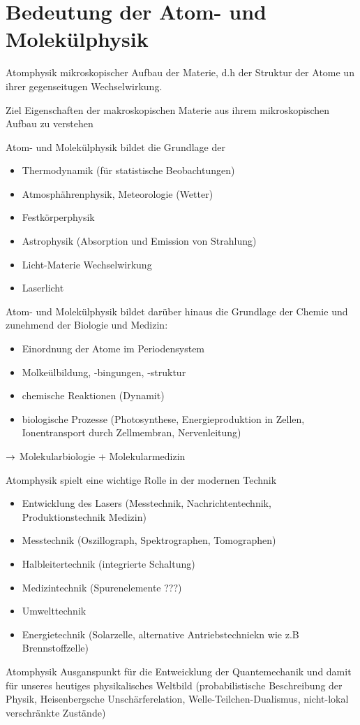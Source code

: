 \section{Bedeutung der Atom- und Molekülphysik} %
\label{sec:Bedeutung der Atom- und Molekülphysik}
\begin{erl}{Atomphysik}
    mikroskopischer Aufbau der Materie, d.h der Struktur der Atome un ihrer
    gegenseitugen Wechselwirkung. 
\end{erl}

\begin{erl}{Ziel}
    Eigenschaften der makroskopischen Materie aus ihrem mikroskopischen Aufbau
    zu verstehen
\end{erl}

Atom- und Molekülphysik bildet die Grundlage der
\begin{itemize}
    \item Thermodynamik (für statistische Beobachtungen)
    \item Atmosphährenphysik, Meteorologie (Wetter)
    \item Festkörperphysik
    \item Astrophysik (Absorption und Emission von Strahlung)
    \item Licht-Materie Wechselwirkung
    \item Laserlicht
\end{itemize}
Atom- und Molekülphysik bildet darüber hinaus die Grundlage der Chemie und
zunehmend der Biologie und Medizin:
\begin{itemize}
    \item Einordnung der Atome im Periodensystem
    \item Molkeülbildung, -bingungen, -struktur
    \item chemische Reaktionen (Dynamit)
    \item biologische Prozesse (Photosynthese, Energieproduktion in Zellen,
    Ionentransport durch Zellmembran, Nervenleitung)
\end{itemize}
$\rightarrow$ Molekularbiologie + Molekularmedizin

Atomphysik spielt eine wichtige Rolle in der modernen Technik
\begin{itemize}
    \item Entwicklung des Lasers (Messtechnik, Nachrichtentechnik,
    Produktionstechnik Medizin)
    \item Messtechnik (Oszillograph, Spektrographen, Tomographen)
    \item Halbleitertechnik (integrierte Schaltung)
    \item Medizintechnik (Spurenelemente ???)
    \item Umwelttechnik
    \item Energietechnik (Solarzelle, alternative Antriebstechniekn wie z.B
    Brennstoffzelle)
\end{itemize}
\begin{erl}{Atomphysik}
Ausganspunkt für die Entweicklung der Quantemechanik und damit für unseres
heutiges physikalisches Weltbild (probabilistische Beschreibung der Physik,
Heisenbergsche Unschärferelation, Welle-Teilchen-Dualismus, nicht-lokal
verschränkte Zustände)
\end{erl}
